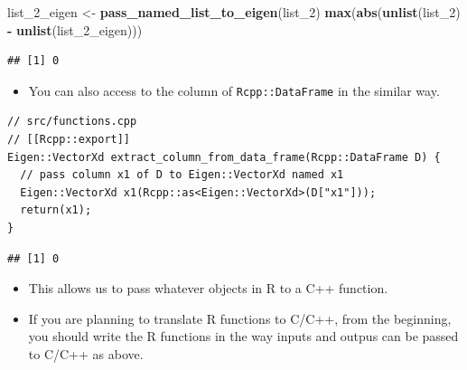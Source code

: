 \documentclass[]{book}
\newenvironment{Shaded}{\begin{snugshade}}{\end{snugshade}}
\newcommand{\KeywordTok}[1]{\textcolor[rgb]{0.13,0.29,0.53}{\textbf{#1}}}
\newcommand{\DecValTok}[1]{\textcolor[rgb]{0.00,0.00,0.81}{#1}}
\newcommand{\StringTok}[1]{\textcolor[rgb]{0.31,0.60,0.02}{#1}}
\newcommand{\CommentTok}[1]{\textcolor[rgb]{0.56,0.35,0.01}{\textit{#1}}}
\newcommand{\OperatorTok}[1]{\textcolor[rgb]{0.81,0.36,0.00}{\textbf{#1}}}
\newcommand{\NormalTok}[1]{#1}
\providecommand{\tightlist}{%
  \setlength{\itemsep}{0pt}\setlength{\parskip}{0pt}}
\begin{document}
\begin{Shaded}
\begin{Highlighting}[]
\NormalTok{list_2_eigen <-}\StringTok{ }\KeywordTok{pass_named_list_to_eigen}\NormalTok{(list_}\DecValTok{2}\NormalTok{)}
\KeywordTok{max}\NormalTok{(}\KeywordTok{abs}\NormalTok{(}\KeywordTok{unlist}\NormalTok{(list_}\DecValTok{2}\NormalTok{) }\OperatorTok{-}\StringTok{ }\KeywordTok{unlist}\NormalTok{(list_2_eigen)))}
\end{Highlighting}
\end{Shaded}

\begin{verbatim}
## [1] 0
\end{verbatim}

\begin{itemize}
\tightlist
\item
  You can also access to the column of \texttt{Rcpp::DataFrame} in the
  similar way.
\end{itemize}

\begin{verbatim}
// src/functions.cpp
// [[Rcpp::export]]
Eigen::VectorXd extract_column_from_data_frame(Rcpp::DataFrame D) {
  // pass column x1 of D to Eigen::VectorXd named x1
  Eigen::VectorXd x1(Rcpp::as<Eigen::VectorXd>(D["x1"]));
  return(x1);
}
\end{verbatim}

\begin{Shaded}
\end{Shaded}

\begin{verbatim}
## [1] 0
\end{verbatim}

\begin{itemize}
\tightlist
\item
  This allows us to pass whatever objects in R to a C++ function.
\item
  If you are planning to translate R functions to C/C++, from the
  beginning, you should write the R functions in the way inputs and
  outpus can be passed to C/C++ as above.
\end{itemize}
\end{document}
